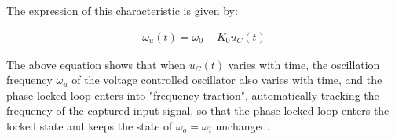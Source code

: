 The expression of this characteristic is given by:

\begin{equation}
\begin{aligned}
    \omega_u(t)=\omega_0+K_0u_C(t)
\end{aligned}
\end{equation}
    
The above equation shows that when $u_C(t)$ varies with time, the oscillation frequency $\omega_u$ of the voltage controlled oscillator also varies with time, and the phase-locked loop enters into "frequency traction", automatically tracking the frequency of the captured input signal, so that the phase-locked loop enters the locked state and keeps the state of $\omega_o=\omega_i$ unchanged.

